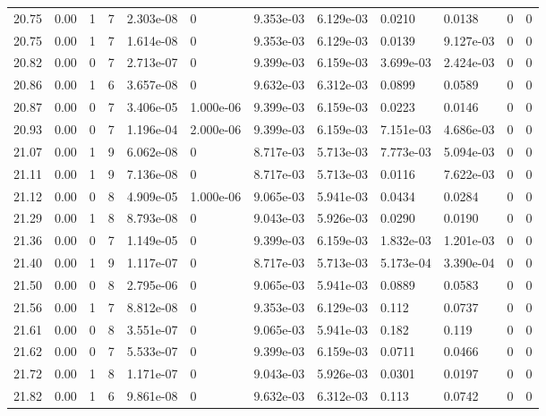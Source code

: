 \documentclass[preview]{standalone}
\begin{document}
{{{{{{{{\begin{tabular}{L{1.2cm}C{1.2cm} C{0.3cm}C{0.5cm} C{1.4cm}C{1.4cm} C{1.4cm}C{1.4cm} C{1.6cm}C{1.6cm} C{1.6cm}C{1.6cm}}
  20.75  &  0.00  & 1     &  7 &  2.303e-08  & 0  &  9.353e-03&   6.129e-03& 0.0210 & 0.0138   &  0 & 0  \\ 
  20.75  &  0.00  & 1     &  7 &  1.614e-08  & 0  &  9.353e-03&   6.129e-03& 0.0139 & 9.127e-03   &  0 & 0  \\ 
  20.82  &  0.00  & 0     &  7 &  2.713e-07  & 0  &  9.399e-03&   6.159e-03& 3.699e-03 & 2.424e-03   &  0 & 0  \\ 
  20.86  &  0.00  & 1     &  6 &  3.657e-08  & 0  &  9.632e-03&   6.312e-03& 0.0899 & 0.0589   &  0 & 0  \\ 
  20.87  &  0.00  & 0     &  7 &  3.406e-05  & 1.000e-06  &  9.399e-03&   6.159e-03& 0.0223 & 0.0146   &  0 & 0  \\ 
  20.93  &  0.00  & 0     &  7 &  1.196e-04  & 2.000e-06  &  9.399e-03&   6.159e-03& 7.151e-03 & 4.686e-03   &  0 & 0  \\ 
  21.07  &  0.00  & 1     &  9 &  6.062e-08  & 0  &  8.717e-03&   5.713e-03& 7.773e-03 & 5.094e-03   &  0 & 0  \\ 
  21.11  &  0.00  & 1     &  9 &  7.136e-08  & 0  &  8.717e-03&   5.713e-03& 0.0116 & 7.622e-03   &  0 & 0  \\ 
  21.12  &  0.00  & 0     &  8 &  4.909e-05  & 1.000e-06  &  9.065e-03&   5.941e-03& 0.0434 & 0.0284   &  0 & 0  \\ 
  21.29  &  0.00  & 1     &  8 &  8.793e-08  & 0  &  9.043e-03&   5.926e-03& 0.0290 & 0.0190   &  0 & 0  \\ 
  21.36  &  0.00  & 0     &  7 &  1.149e-05  & 0  &  9.399e-03&   6.159e-03& 1.832e-03 & 1.201e-03   &  0 & 0  \\ 
  21.40  &  0.00  & 1     &  9 &  1.117e-07  & 0  &  8.717e-03&   5.713e-03& 5.173e-04 & 3.390e-04   &  0 & 0  \\ 
  21.50  &  0.00  & 0     &  8 &  2.795e-06  & 0  &  9.065e-03&   5.941e-03& 0.0889 & 0.0583   &  0 & 0  \\ 
  21.56  &  0.00  & 1     &  7 &  8.812e-08  & 0  &  9.353e-03&   6.129e-03& 0.112 & 0.0737   &  0 & 0  \\ 
  21.61  &  0.00  & 0     &  8 &  3.551e-07  & 0  &  9.065e-03&   5.941e-03& 0.182 & 0.119   &  0 & 0  \\ 
  21.62  &  0.00  & 0     &  7 &  5.533e-07  & 0  &  9.399e-03&   6.159e-03& 0.0711 & 0.0466   &  0 & 0  \\ 
  21.72  &  0.00  & 1     &  8 &  1.171e-07  & 0  &  9.043e-03&   5.926e-03& 0.0301 & 0.0197   &  0 & 0  \\ 
  21.82  &  0.00  & 1     &  6 &  9.861e-08  & 0  &  9.632e-03&   6.312e-03& 0.113 & 0.0742   &  0 & 0  \\ 

\end{tabular}}}}}}}}}
\end{document}
